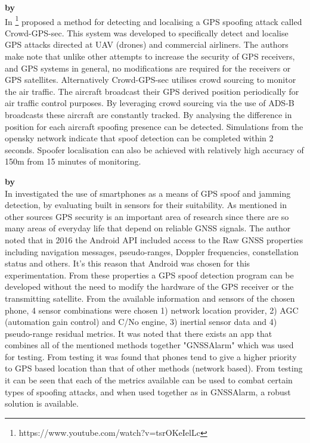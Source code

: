 \medskip

\textbf{\emph{} by \citeauthor{RN24}} \\
In \citeyear{RN24} \citeauthor{RN24} \cite{RN24} \footnote{https://www.youtube.com/watch?v=tsrOKeIelLc} proposed a method for detecting and localising
a GPS spoofing attack called Crowd-GPS-sec. This system was developed to specifically detect and localise GPS attacks directed at UAV (drones) and commercial
airliners. The authors make note that unlike other attempts to increase the security of GPS receivers, and GPS systems in general, no modifications are required
for the receivers or GPS satellites. Alternatively Crowd-GPS-sec utilises crowd sourcing to monitor the air traffic. The aircraft broadcast their GPS derived position
periodically for air traffic control purposes. By leveraging crowd sourcing via the use of ADS-B broadcasts these aircraft are constantly tracked. 
By analysing the difference in position for each aircraft spoofing presence can be detected. Simulations from the opensky network indicate that spoof detection can be 
completed within 2 seconds. Spoofer localisation can also be achieved with relatively high accuracy of 150m from 15 minutes of monitoring.

\medskip

\textbf{\emph{} by \citeauthor{RN31}} \\
In \citeyear{RN31} \citeauthor{RN31} \cite{RN31} investigated the use of smartphones as a means of GPS spoof and jamming detection, by evaluating built in
sensors for their suitability. As mentioned in other sources GPS security is an important area of research since there are so many areas of everyday life that depend on reliable GNSS signals.
The author noted that in 2016 the Android API included access to the Raw GNSS properties including navigation messages, pseudo-ranges,
Doppler frequencies, constellation status and others. It's this reason that Android was chosen for this experimentation. From these properties a GPS spoof detection program
can be developed without the need to modify the hardware of the GPS receiver or the transmitting satellite. 
From the available information and sensors of the chosen phone, 4 sensor combinations were chosen 1) network location provider, 2) AGC (automation gain control) and C/No engine,
3) inertial sensor data and 4) pseudo-range residual metrics. It was noted that there exists an app that combines all of the mentioned methods together "GNSSAlarm" which was
used for testing. From testing it was found that phones tend to give a higher priority to GPS based location than that of other methods (network based). 
From testing it can be seen that each of the metrics available can be used to combat certain types of spoofing attacks, and when used together as in GNSSAlarm, 
a robust solution is available.


